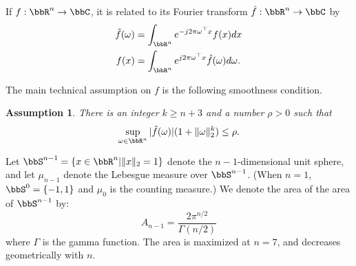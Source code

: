 \documentclass[letterpaper, 10 pt, conference]{ieeeconf}  %
\newtheorem{lemma}{Lemma}
\newtheorem{assumption}{Assumption}
\begin{document}
If $f:\bbR^n \to \bbC$, it is related to its Fourier transform $\hat f:\bbR^n\to \bbC$ by
\begin{subequations}
\begin{align}
  \label{eq:ft}
  \hat f(\omega)&=\int_{\bbR^n}e^{-j2\pi \omega^\top x} f(x)dx\\
  \label{eq:ift}
  f(x)&=\int_{\bbR^n}e^{j2\pi \omega^\top x}\hat f(\omega)d\omega.
\end{align}
\end{subequations}


The main technical assumption on $f$ is the following smoothness condition.

\begin{assumption}
  \label{as:smoothness}
  There is an integer $k\ge n+3$ and a number $\rho >0$ such that 
  $$
  \sup_{\omega\in\bbR^n} |\hat f(\omega)| (1+\|\omega\|_2^k) \le \rho.
  $$
\end{assumption}

Let $\bbS^{n-1}=\{x\in\bbR^n|\|x\|_2=1\}$ denote the $n-1$-dimensional unit sphere, and let $\mu_{n-1}$ denote the Lebesgue measure over $\bbS^{n-1}$. (When $n=1$, $\bbS^{0}=\{-1,1\}$ and $\mu_0$ is the counting measure.)
We denote the area of the area of $\bbS^{n-1}$ by:
\begin{equation*}
  \label{eq:sphereArea}
  A_{n-1} = \frac{2\pi^{n/2}}{\Gamma(n/2)}
\end{equation*}
where $\Gamma$  is the gamma function. The area is maximized at $n=7$, and decreases geometrically with $n$.





\end{document}
